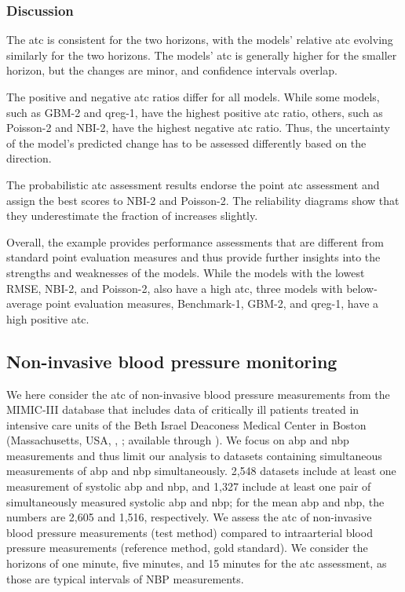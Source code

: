 \documentclass[pdflatex]{sn-jnl}
\theoremstyle{plain}%
\theoremstyle{definition}
\begin{document}
\subsubsection*{Discussion}

The \ac{atc} is consistent for the two horizons, with the models' relative \ac{atc} evolving similarly for the two horizons.
The models' \ac{atc} is generally higher for the smaller horizon, but the changes are minor, and confidence intervals overlap.

The positive and negative \ac{atc} ratios differ for all models.
While some models, such as GBM-2 and qreg-1, have the highest positive \ac{atc} ratio, others, such as Poisson-2 and NBI-2, have the highest negative \ac{atc} ratio.
Thus, the uncertainty of the model's predicted change has to be assessed differently based on the direction.

The probabilistic \ac{atc} assessment results endorse the point \ac{atc} assessment and assign the best scores to NBI-2 and Poisson-2.
The reliability diagrams show that they underestimate the fraction of increases slightly.

Overall, the example provides performance assessments that are different from standard point evaluation measures and thus provide further insights into the strengths and weaknesses of the models.
While the models with the lowest RMSE, NBI-2, and Poisson-2, also have a high \ac{atc}, three models with below-average point evaluation measures, Benchmark-1, GBM-2, and qreg-1, have a high positive \ac{atc}.


\subsection{Non-invasive blood pressure monitoring} \label{sec:application_measurement}

We here consider the \ac{atc} of non-invasive blood pressure measurements from the MIMIC-III database that includes data of critically ill patients treated in intensive care units of the Beth Israel Deaconess Medical Center in Boston (Massachusetts, USA, \cite{Johnson2016}, \citealp{Moody2017}; available through \citealp{Goldberger2000}).
We focus on \acf{abp} and \acf{nbp} measurements and thus limit our analysis to datasets containing simultaneous measurements of \ac{abp} and \ac{nbp} simultaneously.
2,548 datasets include at least one measurement of systolic \ac{abp} and \ac{nbp}, and 1,327 include at least one pair of simultaneously measured systolic \ac{abp} and \ac{nbp}; for the mean \ac{abp} and \ac{nbp}, the numbers are 2,605 and 1,516, respectively.
We assess the \ac{atc} of non-invasive blood pressure measurements (test method) compared to intraarterial blood pressure measurements (reference method, gold standard).
We consider the horizons of one minute, five minutes, and 15 minutes for the \ac{atc} assessment, as those are typical intervals of NBP measurements.
\end{document}
